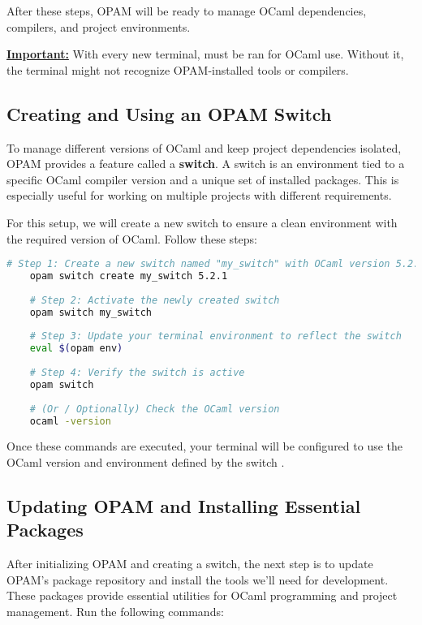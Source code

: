 \noindent
After these steps, OPAM will be ready to manage OCaml dependencies, compilers, and project environments.
\begin{Note}
	\underline{\textbf{Important:}} With every new terminal,  must be ran for OCaml use.
	Without it, the terminal might not recognize OPAM-installed tools or compilers.
\end{Note}

\subsection{Creating and Using an OPAM Switch}

To manage different versions of OCaml and keep project dependencies isolated, OPAM provides a feature called a \textbf{switch}.
A switch is an environment tied to a specific OCaml compiler version and a unique set of installed packages. This is especially
useful for working on multiple projects with different requirements.

\newpage
\noindent
For this setup, we will create a new switch to ensure a clean environment with the required version of OCaml.
Follow these steps:

\begin{lstlisting}[language=Bash, caption={Creating and Activating an OPAM Switch}]
    # Step 1: Create a new switch named "my_switch" with OCaml version 5.2.1
    opam switch create my_switch 5.2.1
    
    # Step 2: Activate the newly created switch
    opam switch my_switch
    
    # Step 3: Update your terminal environment to reflect the switch
    eval $(opam env)
    
    # Step 4: Verify the switch is active
    opam switch
    
    # (Or / Optionally) Check the OCaml version
    ocaml -version
\end{lstlisting}

\noindent
Once these commands are executed, your terminal will be configured to use the OCaml version and environment
defined by the switch .

\subsection{Updating OPAM and Installing Essential Packages}
\label{subsec:opam_packages}
After initializing OPAM and creating a switch, the next step is to update OPAM's package repository and install
the tools we'll need for development. These packages provide essential utilities for OCaml programming and project management.
Run the following commands:

